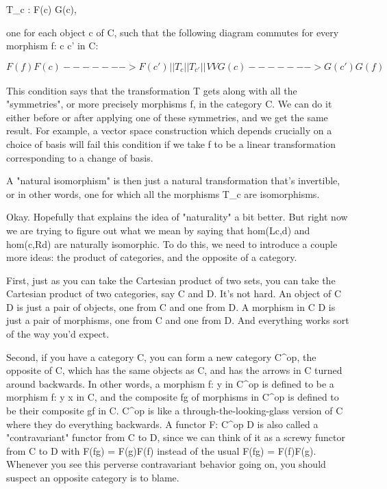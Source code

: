 T_{c} : F(c) \to  G(c),

one for each object c of C, such that the following diagram 
commutes for every morphism f: c \to  c' in C: 


$$

                              F(f)
                       F(c) -------> F(c') 
 _{ }                      |             |
                     T_{c} |             | T_{c'}
 _{ }                      |             |
 _{ }                      V             V
                       G(c) -------> G(c')
                              G(f)

$$
    
This condition says that the transformation T gets along with all the
"symmetries", or more precisely morphisms f, in the category C.   We
can do it either before or after applying one of these symmetries, and
we get the same result.  For example, a vector space construction which 
depends crucially on a choice of basis will fail this condition if we take 
f to be a linear transformation corresponding to a change of basis. 

A "natural isomorphism" is then just a natural transformation that's
invertible, or in other words, one for which all the morphisms T_{c}
are isomorphisms.

Okay.  Hopefully that explains the idea of "naturality" a bit better.
But right now we are trying to figure out what we mean by 
saying that hom(Lc,d) and hom(c,Rd) are naturally isomorphic.  To do this, 
we need to introduce a couple more ideas: the product of categories,
and the opposite of a category.

First, just as you can take the Cartesian product of two sets, you can take
the Cartesian product of two categories, say C and D.
It's not hard.   An object of C \times  D is just a pair of objects,
one from C and one from D.  A morphism in C \times  D is just a pair of morphisms,
one from C and one from D.  And everything works sort of the way you'd expect.

Second, if you have a category C, you can form a new category
C^{op}, the opposite of C, which has the same objects as C, and
has the arrows in C turned around backwards.  In other words, a morphism
f: \times  \to  y in C^{op} is defined to be a morphism f: y \to  x
in C, and the composite fg of morphisms in C^{op} is defined to
be their composite gf in C.  C^{op} is like a
through-the-looking-glass version of C where they do everything
backwards.  A functor F: C^{op} \to  D is also called a
"contravariant" functor from C to D, since we can think of it
as a screwy functor from C to D with F(fg) = F(g)F(f) instead of the
usual F(fg) = F(f)F(g).  Whenever you see this perverse contravariant
behavior going on, you should suspect an opposite category is to blame.

